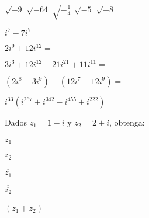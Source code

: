 \documentclass[12pt,addpoints,x11names]{exam}
\begin{document}
\begin{questions}

\question $\sqrt{-9}$
  \answerline
  \question $\sqrt{-64}$
  \answerline
  \question $\sqrt{-\frac{1}{4}}$
  \answerline
  \question $\sqrt{-5}$
  \answerline
  \question $\sqrt{-8}$
  \answerline
 



\question $i^7-7i^7=$
  \answerline

\question $2i^9+12i^{12}=$
  \answerline

\question $3i^3+12i^{12}-21i^{21}+11i^{11}=$
  \answerline

\question $(2i^8+3i^9)-(12i^7-12i^9)=$
  \answerline

\question $i^{33}(i^{267}+i^{342}-i^{455}+i^{222})=$
  \answerline

\newpage


\twocolumn
{}

Dados $z_1=1-i$ y $z_2=2+i$, obtenga:


\question $\overline{z_1}$
   \begin{solutionbox}{1in}
    
  \end{solutionbox}

\question $\overline{z_2}$
   \begin{solutionbox}{1in}
    
  \end{solutionbox}

\question $\overline{\overline{z_1}}$
   \begin{solutionbox}{1in}
    
  \end{solutionbox}

\question $\overline{\overline{z_2}}$
   \begin{solutionbox}{1in}
    
  \end{solutionbox}

\question $\overline{(z_1+z_2)}$
   \begin{solutionbox}{1in}
    
  \end{solutionbox}

\vspace{3cm}
  

\end{questions}
\end{document}
